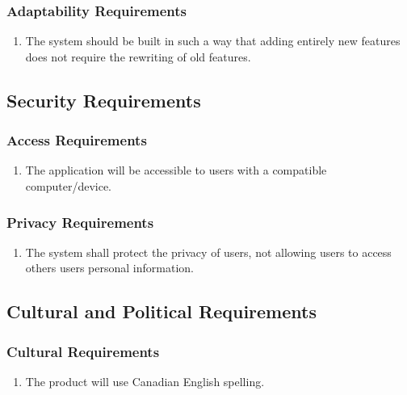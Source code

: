 \documentclass[english]{article}
\begin{document}
\subsubsection{Adaptability Requirements}
\label{ssub:adaptability_requirements}
\begin{enumerate}[{MAR}1. ]
\item The system should be built in such a way that adding entirely new features does not require the rewriting of old features.

\end{enumerate}


\subsection{Security Requirements}
\label{sub:security_requirements}

\subsubsection{Access Requirements}
\label{ssub:access_requirements}
\begin{enumerate}[{SAR}1. ]
\item The application will be accessible to users with a compatible computer/device.


\end{enumerate}
\subsubsection{Privacy Requirements}
\label{ssub:privacy_requirements}
\begin{enumerate}[{SPR}1. ]
\item The system shall protect the privacy of users, not allowing users to access others users personal information.
\end{enumerate}


\subsection{Cultural and Political Requirements}
\label{sub:cultural_and_political_requirements}

\subsubsection{Cultural Requirements}
\label{ssub:cultural_requirements}
\begin{enumerate}[{CCR}1. ]
\item The product will use Canadian English spelling.
\end{enumerate}
\end{document}
